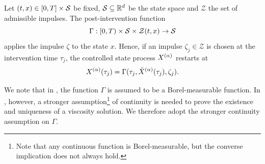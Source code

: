 \begin{definition}
\label{def: Post-intervention Function}
    Let $(t,x) \in [0,T] \times \mathcal{S}$ be fixed, $\mathcal{S} \subseteq \mathbb{R}^d$ be the state space and $\mathcal Z$ the set of admissible impulses. The post-intervention function
    \begin{equation*}
        \Gamma: [0,T) \times \mathcal{S} \times \mathcal Z(t,x) \rightarrow \mathcal{S}
    \end{equation*}
    applies the impulse $\zeta$ to the state $x$. Hence, if an impulse $\zeta_j \in \mathcal Z$ is chosen at the intervention time $\tau_j$, the controlled state process $X^{(\alpha)}$ restarts at
    \begin{equation*}
        X^{(\alpha)} (\tau_j) = \Gamma (\tau_j, \check{X}^{(\alpha)}(\tau_j), \zeta_j).
    \end{equation*}
\end{definition}
\begin{remark}
    We note that in \cite{oksendal2007applied}, the function $\Gamma$ is assumed to be a Borel-measurable function. In \cite{seydel2010generalexistenceuniquenessviscosity}, however, a stronger assumption\footnote{Note that any continuous function is Borel-measurable, but the converse implication does not always hold.} of continuity is needed to prove the existence and uniqueness of a viscosity solution. We therefore adopt the stronger continuity assumption on $\Gamma$.
\end{remark}

